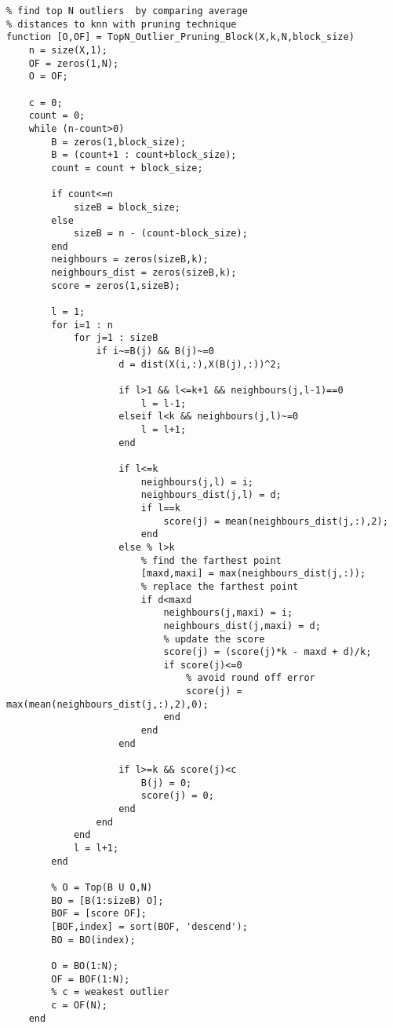 \lstset{language=Matlab}
\begin{lstlisting}
% find top N outliers  by comparing average 
% distances to knn with pruning technique
function [O,OF] = TopN_Outlier_Pruning_Block(X,k,N,block_size)
	n = size(X,1);
	OF = zeros(1,N);
	O = OF;

	c = 0;
	count = 0;
	while (n-count>0)
		B = zeros(1,block_size);
		B = (count+1 : count+block_size);
		count = count + block_size;        
		
		if count<=n
			sizeB = block_size;
		else
			sizeB = n - (count-block_size);
		end
		neighbours = zeros(sizeB,k);
		neighbours_dist = zeros(sizeB,k);
		score = zeros(1,sizeB);

		l = 1;
		for i=1 : n
			for j=1 : sizeB
				if i~=B(j) && B(j)~=0
					d = dist(X(i,:),X(B(j),:))^2;
		            
					if l>1 && l<=k+1 && neighbours(j,l-1)==0
						l = l-1;
					elseif l<k && neighbours(j,l)~=0
						l = l+1;
					end
		            
					if l<=k 
						neighbours(j,l) = i;   
						neighbours_dist(j,l) = d;
						if l==k
							score(j) = mean(neighbours_dist(j,:),2);
						end
					else % l>k
						% find the farthest point
						[maxd,maxi] = max(neighbours_dist(j,:));
						% replace the farthest point
						if d<maxd 
							neighbours(j,maxi) = i;
							neighbours_dist(j,maxi) = d;
							% update the score
							score(j) = (score(j)*k - maxd + d)/k;
							if score(j)<=0
								% avoid round off error
								score(j) = max(mean(neighbours_dist(j,:),2),0);
							end
						end                    
					end
		            
					if l>=k && score(j)<c
						B(j) = 0;                    
						score(j) = 0;                   
					end                                            
				end
			end
			l = l+1;
		end
		
		% O = Top(B U O,N)
		BO = [B(1:sizeB) O];
		BOF = [score OF];
		[BOF,index] = sort(BOF, 'descend');
		BO = BO(index);
		
		O = BO(1:N);
		OF = BOF(1:N);    
		% c = weakest outlier
		c = OF(N);
	end
\end{lstlisting}
